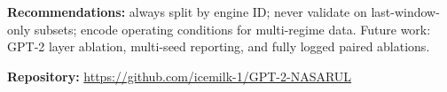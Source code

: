 \documentclass[10pt,twocolumn]{article}
\begin{document}
\textbf{Recommendations:} always split by engine ID; never validate on last-window-only subsets; encode operating conditions for multi-regime data.
Future work: GPT-2 layer ablation, multi-seed reporting, and fully logged paired ablations.

\vspace{0.3em}
\noindent\textbf{Repository:} \url{https://github.com/icemilk-1/GPT-2-NASARUL}
\end{document}
